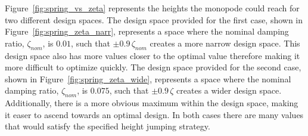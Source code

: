 Figure~\ref{fig:spring_vs_zeta} represents the heights the monopode could reach for two different design spaces. The design space provided for the first case, shown in Figure~\ref{fig:spring_zeta_narr}, represents a space where the nominal damping ratio, $\zeta_{nom}$, is $0.01$, such that $\pm0.9 \, \zeta_{nom}$ creates a more narrow design space. This design space also has more values closer to the optimal value therefore making it more difficult to optimize quickly. The design space provided for the second case, shown in Figure~\ref{fig:spring_zeta_wide}, represents a space where the nominal damping ratio, $\zeta_{nom}$, is $0.075$, such that $\pm0.9 \, \zeta$ creates a wider design space. Additionally, there is a more obvious maximum within the design space, making it easer to ascend towards an optimal design. In both cases there are many values that would satisfy the specified height jumping strategy.

